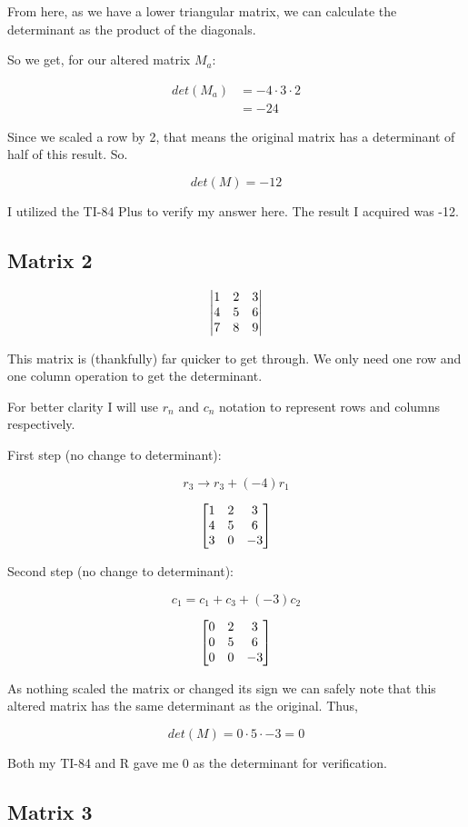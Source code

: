 From here, as we have a lower triangular matrix, we can calculate the determinant as the product of the diagonals. 

So we get, for our altered matrix $M_a$: 

\[
	\begin{aligned}	
		det(M_a) &= -4 \cdot 3 \cdot 2 \\
		&= -24	
	\end{aligned}
\]

Since we scaled a row by 2, that means the original matrix has a determinant of half of this result. So.

\[det(M) = -12\]

I utilized the TI-84 Plus to verify my answer here. The result I acquired was -12.

\subsection{Matrix 2}

\[
	\genericmat{v}{1 & 2 & 3 \\ 4 & 5 & 6 \\ 7 & 8 & 9}
\]

This matrix is (thankfully) far quicker to get through. We only need one row and one column operation to get the determinant.

For better clarity I will use $r_n$ and $c_n$ notation to represent rows and columns respectively.

First step (no change to determinant):

\[r_3 \to r_3 + (-4)r_1\]

\[
	\genericmat{b}{1 & 2 & 3 \\ 4 & 5 & 6 \\ 3 & 0 & -3}
\]

Second step (no change to determinant):

\[c_1 = c_1 + c_3 + (-3)c_2\]

\[
	\genericmat{b}{0 & 2 & 3 \\ 0 & 5 & 6 \\ 0 & 0 & -3}
\]

As nothing scaled the matrix or changed its sign we can safely note that this altered matrix has the same determinant as the original. Thus,

\[det(M) = 0 \cdot 5 \cdot -3 = 0\]

Both my TI-84 and R gave me 0 as the determinant for verification. 

\subsection{Matrix 3}

